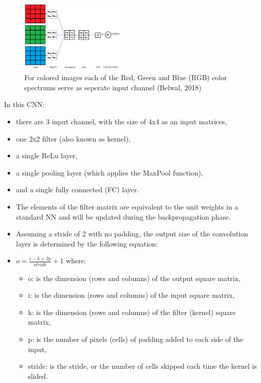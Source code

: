 

\begin{vbframe}

 \begin{figure}
    \centering
    \includegraphics[width=5cm]{figure/3channel.png}
    \caption{For colored images each of the Red, Green and Blue (RGB) color spectrums serve as seperate input channel (Belwal, 2018)}
  \end{figure}

In this CNN:
    \begin{itemize}
       \item there are 3 input channel, with the size of 4x4 as an input matrices, 
       \item one 2x2 filter (also known as kernel), 
       \item a single ReLu layer,
       \item a single pooling layer (which applies the MaxPool function),
       \item and a single fully connected (FC) layer.
    \end{itemize}

    \begin{itemize}
       \item The elements of the filter matrix are equivalent to the unit weights in a standard NN and will be updated during the backpropagation phase.
       \item Assuming a stride of 2 with no padding, the output size of the convolution layer is determined by the following equation:
       \item $ o = \frac{i - k + 2p}{stride} + 1$ where: 
    \begin{itemize}
       \item o: is the dimension (rows and columns) of the output square matrix, 
       \item i: is the dimension (rows and columns) of the input square matrix,
       \item k: is the dimension (rows and columns) of the filter (kernel) square matrix, 
       \item p: is the number of pixels (cells) of padding added to each side of the input,
       \item stride: is the stride, or the number of cells skipped each time the kernel is slided.
    \end{itemize}
    \end{itemize}


\end{vbframe}
